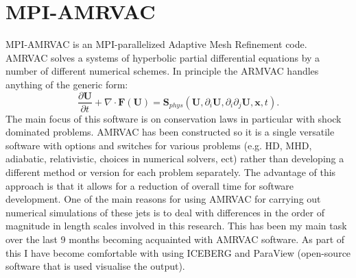 \documentclass[12pt]{ociamthesis}
\begin{document}
\section{MPI-AMRVAC}
MPI-AMRVAC is an MPI-parallelized Adaptive Mesh Refinement code. AMRVAC solves a systems of hyperbolic partial differential equations by a number of different numerical schemes. In principle the ARMVAC handles anything of the generic form: 
\begin{equation}
\frac{\partial \boldsymbol{U}}{\partial t} + \nabla \cdot \boldsymbol{F}(\boldsymbol{U}) = \boldsymbol{S}_{phys} (\boldsymbol{U}, \partial_{i} \boldsymbol{U}, \partial_i \partial_j \boldsymbol{U},\boldsymbol{x},t) .
\end{equation}
The main focus of this software is on conservation laws in particular with shock dominated problems. AMRVAC has been constructed so it is a single versatile software with options and switches for various problems (e.g. HD, MHD, adiabatic, relativistic, choices in numerical solvers, ect) rather than developing a different method or version for each problem separately. The advantage of this approach is that it allows for a reduction of overall time for software development. One of the main reasons for using AMRVAC for carrying out numerical simulations of these jets is to deal with differences in the order of magnitude in length scales involved in this research. This has been my main task over the last 9 months becoming acquainted with AMRVAC software. As part of this I have become comfortable with using ICEBERG and ParaView (open-source software that is used visualise the output).
\end{document}
